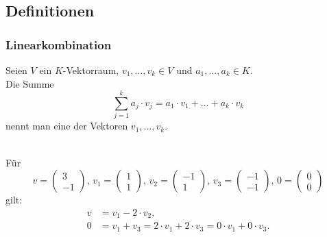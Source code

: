 \subsection{Definitionen}
%
\begin{frame}\frametitle{Linearkombination}
	
	\vspace{2mm}
	Seien $V$ ein $K$-Vektorraum, $v_1,\ldots, v_k \in V$ und $a_1,\ldots, a_k \in K$. \\[1mm]
	
	Die Summe
	$$
		\sum_{j=1}^k a_j\cdot v_j = a_1\cdot v_1 + \ldots + a_k\cdot v_k
	$$ 
	nennt man eine  der Vektoren $v_1, \ldots, v_k$.
	
	\pause
	\vspace{3mm}
	\\[1mm]
	
	Für 
	$$
		v = \begin{pmatrix}
				3\\
				-1
			\end{pmatrix},
		\,
		v_1 = \begin{pmatrix}
				1\\
				1
			\end{pmatrix},
		\,
		v_2 = \begin{pmatrix}
				-1\\
				1
			\end{pmatrix},
		\,	
		v_3 = \begin{pmatrix}
				-1\\
				-1
			\end{pmatrix},
		\,
		0 = \begin{pmatrix}
				0\\
				0
			\end{pmatrix}	
	$$
	gilt:
	\begin{align*}
		v	&= v_1 -2\cdot v_2,\\
		0	&= v_1 + v_3	= 2\cdot v_1 + 2\cdot v_3 = 0\cdot v_1 + 0\cdot v_3.	
	\end{align*}
	
\end{frame}
%
%
